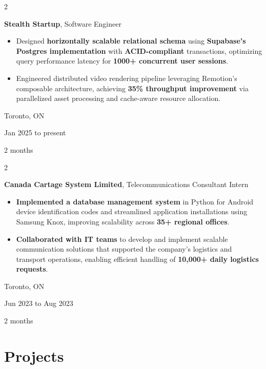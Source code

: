 \documentclass[10pt, letterpaper]{article}
\newenvironment{highlights}{
    \begin{itemize}[
        topsep=0.10 cm,
        parsep=0.10 cm,
        partopsep=0pt,
        itemsep=0pt,
        leftmargin=0.4 cm + 10pt
    ]
}{
    \end{itemize}
} %
\newenvironment{twocolentry}[2][]{
    \onecolentry
    \def\secondColumn{#2}
    \setcolumnwidth{\fill, 2.5 cm}
    \begin{paracol}{2}
}{
    \switchcolumn \raggedleft \secondColumn
    \end{paracol}
    \endonecolentry
} %
\begin{document}
        \begin{twocolentry}{
            Toronto, ON

        Jan 2025 to present

        2 months
        }
            \textbf{Stealth Startup}, Software Engineer
            \begin{highlights}
                \item Designed \textbf{horizontally scalable relational schema} using \textbf{Supabase's Postgres implementation} with \textbf{ACID-compliant} transactions, optimizing query performance latency for \textbf{1000+ concurrent user sessions}.
                \item Engineered distributed video rendering pipeline leveraging Remotion's composable architecture, achieving \textbf{35\% throughput improvement} via parallelized asset processing and cache-aware resource allocation.
            \end{highlights}
        \end{twocolentry}


        \vspace{0.05 cm}

        \begin{twocolentry}{
            Toronto, ON

        Jun 2023 to Aug 2023

        2 months
        }
            \textbf{Canada Cartage System Limited}, Telecommunications Consultant Intern
            \begin{highlights}
                \item \textbf{Implemented a database management system} in Python for Android device identification codes and streamlined application installations using Samsung Knox, improving scalability across \textbf{35+ regional offices}.
                \item \textbf{Collaborated with IT teams} to develop and implement scalable communication solutions that supported the company’s logistics and transport operations, enabling efficient handling of \textbf{10,000+ daily logistics requests}.
            \end{highlights}
        \end{twocolentry}



    
    \section{Projects}
\end{document}
